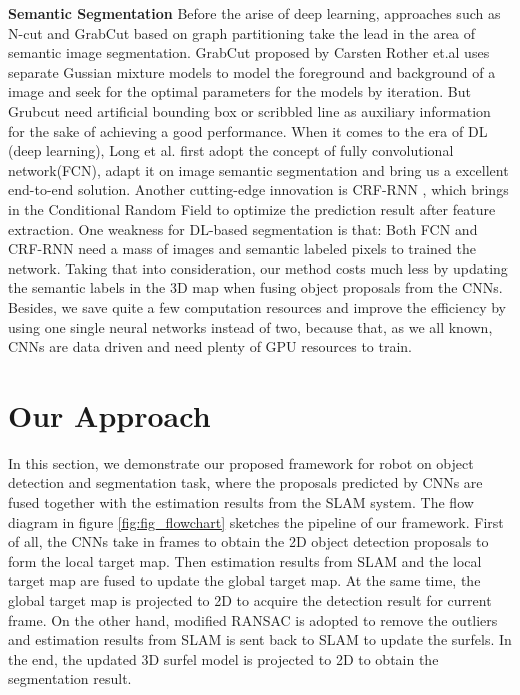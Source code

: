\documentclass[conference]{IEEEtran}
\begin{document}
\textbf{Semantic Segmentation} 
Before the arise of deep learning, approaches such as N-cut \cite{Shi2000} and GrabCut \cite{Rother2004} based on graph partitioning  take the lead in the area of semantic image segmentation. GrabCut proposed by Carsten Rother et.al uses separate Gussian mixture models to model the foreground and background  of a image and seek for the optimal parameters for the models by iteration. But Grubcut need artificial  bounding box or scribbled line as auxiliary information for the sake of achieving a good performance. When it comes to the era of DL (deep learning), Long et al. \cite{long2015fully} first adopt the concept of fully convolutional network(FCN), adapt it on image semantic segmentation and bring us a excellent end-to-end solution. Another cutting-edge innovation is CRF-RNN \cite{Zheng2015}, which brings in the Conditional Random Field to optimize the prediction result after feature extraction. One weakness for DL-based segmentation is that: Both FCN \cite{long2015fully}and CRF-RNN \cite{Zheng2015}need a mass of images and semantic labeled pixels to trained the network. Taking that into consideration, our method costs much less by updating the semantic labels in the 3D map when fusing object proposals from the CNNs. Besides, we save quite a few computation resources and improve the efficiency by using one single neural networks instead of two, because that, as we all known, CNNs are data driven and need plenty of GPU resources to train. 


\section{\textbf{Our Approach}}

In this section, we demonstrate our proposed framework for robot on object detection and segmentation task, where the proposals predicted by CNNs are fused together with the estimation results from the SLAM system. The flow diagram in figure \ref{fig:fig_flowchart} sketches the pipeline of our framework. First of all, the CNNs take in frames to obtain the 2D object detection proposals to form the local target map. Then estimation results from SLAM and the local target map are fused to update the global target map. At the same time, the global target map is projected to 2D to acquire the detection result for current frame. On the other hand, modified RANSAC is adopted to remove the outliers and estimation results from SLAM is sent back to SLAM to update the surfels. In the end, the updated 3D surfel model is projected to 2D to obtain the segmentation result.
\end{document}
